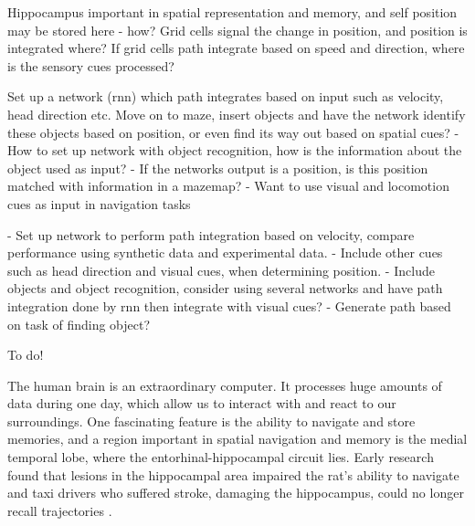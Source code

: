 Hippocampus important in spatial representation and memory, and self position may be stored here - how?
Grid cells signal the change in position, and position is integrated where?
If grid cells path integrate based on speed and direction, where is the sensory cues processed?

Set up a network (rnn) which path integrates based on input such as velocity, head direction etc. Move on to maze, insert objects and have the network identify these objects based on position, or even find its way out based on spatial cues?
- How to set up network with object recognition, how is the information about the object used as input?
- If the networks output is a position, is this position matched with information in a mazemap? 
- Want to use visual and locomotion cues as input in navigation tasks

- Set up network to perform path integration based on velocity, compare performance using synthetic data and experimental data. 
- Include other cues such as head direction and visual cues, when determining position.
- Include objects and object recognition, consider using several networks and have path integration done by rnn then integrate with visual cues?
- Generate path based on task of finding object?


To do!


The human brain is an extraordinary computer. It processes huge amounts of data during one day, which allow us to interact with and react to our surroundings. %
One fascinating feature is the ability to navigate and store memories, and a region important in spatial navigation and memory is the medial temporal lobe, where the entorhinal-hippocampal circuit lies. Early research found that lesions in the hippocampal area impaired the rat's ability to navigate %
and taxi drivers who suffered stroke, damaging the hippocampus, could no longer recall trajectories \cite{maguire:2000:navigation}.

